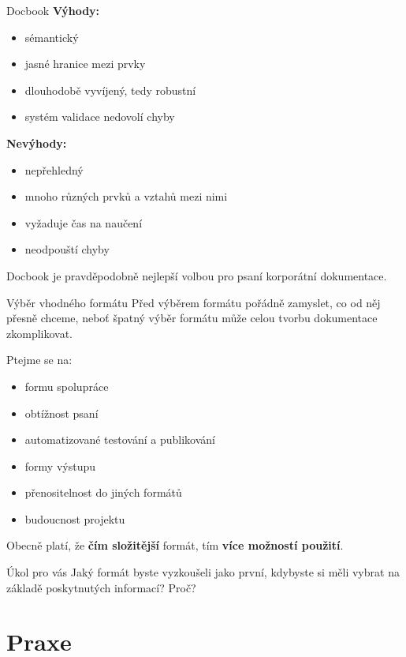 \documentclass[12pt,a4paper]{beamer}
\begin{document}
	\begin{frame}{Docbook}
	\textbf{Výhody:}
	\begin{itemize}
		\item sémantický
		\item jasné hranice mezi prvky
		\item dlouhodobě vyvíjený, tedy robustní
		\item systém validace nedovolí chyby
	\end{itemize}	
	\textbf{Nevýhody:}
	\begin{itemize}
		\item nepřehledný
		\item mnoho různých prvků a vztahů mezi nimi
		\item vyžaduje čas na naučení
		\item neodpouští chyby
	\end{itemize}				
	Docbook je pravděpodobně nejlepší volbou pro psaní korporátní dokumentace.
	\end{frame}

	\begin{frame}{Výběr vhodného formátu}
	Před výběrem formátu pořádně zamyslet, co od něj přesně chceme, neboť špatný výběr formátu může celou tvorbu dokumentace zkomplikovat.

	Ptejme se na:
	
	\begin{itemize}
		\item formu spolupráce
		\item obtížnost psaní
		\item automatizované testování a publikování
		\item formy výstupu
		\item přenositelnost do jiných formátů
		\item budoucnost projektu
	\end{itemize}
	Obecně platí, že \textbf{čím složitější} formát, tím \textbf{více možností použití}.
	\end{frame}

	  \begin{frame}{Úkol pro vás}
			Jaký formát byste vyzkoušeli jako první, kdybyste si měli vybrat na základě poskytnutých informací? Proč?
	  \end{frame}


	\section{Praxe}	
\end{document}
